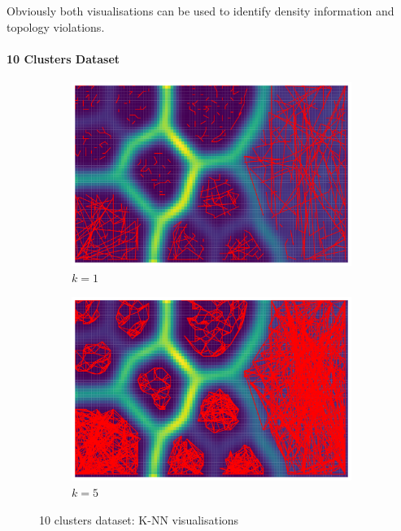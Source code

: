 \documentclass[12pt]{article}
\begin{document}
Obviously both visualisations can be used to identify density information and topology violations.

\paragraph*{10 Clusters Dataset}
\begin{figure}[t]
    \centering
    \begin{subfigure}{.5\textwidth}
      \centering
      \includegraphics[width=.9\linewidth]{vis/10clusters_k_1.png}
      \caption{$k=1$}
      \label{fig:10clustersk1}
    \end{subfigure}%
    \begin{subfigure}{.5\textwidth}
      \centering
      \includegraphics[width=.9\linewidth]{vis/10clusters_k_5.png}
      \caption{$k=5$}
      \label{fig:10clustersk5}
    \end{subfigure}
    \caption{10 clusters dataset: K-NN visualisations}
    \label{fig:10clustersknn}
\end{figure}
\end{document}
